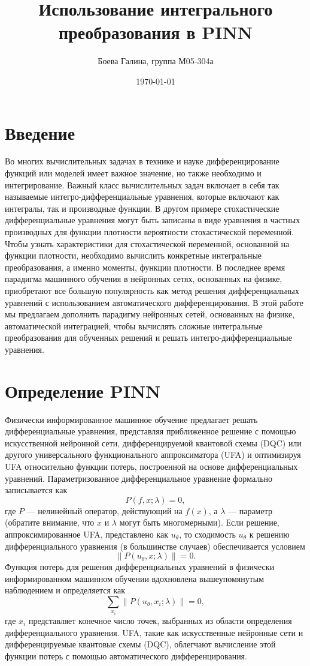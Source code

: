 \documentclass[a4paper,12pt]{article}
\theoremstyle{plain} %
\theoremstyle{definition} %
\theoremstyle{remark} %
\begin{document}
\title{Использование интегрального преобразования в PINN}
\author{Боева Галина, группа М05-304а}
\date{\today}

\maketitle

\section{Введение}

Во многих вычислительных задачах в технике и науке дифференцирование функций или моделей имеет важное значение, но также необходимо и интегрирование. Важный класс вычислительных задач включает в себя так называемые интегро-дифференциальные уравнения, которые включают как интегралы, так и производные функции. В другом примере стохастические дифференциальные уравнения могут быть записаны в виде уравнения в частных производных для функции плотности вероятности стохастической переменной. Чтобы узнать характеристики для стохастической переменной, 
основанной на функции плотности, необходимо вычислить конкретные интегральные преобразования, а именно моменты, функции плотности. 
В последнее время парадигма машинного обучения в нейронных сетях, основанных на физике, приобретают все большую популярность как метод решения дифференциальных уравнений с использованием автоматического дифференцирования. В этой работе мы предлагаем дополнить парадигму нейронных сетей, основанных на физике, автоматической интеграцией, чтобы вычислять сложные интегральные преобразования для обученных решений и решать интегро-дифференциальные уравнения.

\section{Определение PINN}

Физически информированное машинное обучение предлагает решать дифференциальные уравнения, представляя приближенное решение с помощью искусственной нейронной сети, дифференцируемой квантовой схемы (DQC) или другого универсального функционального аппроксиматора (UFA) и оптимизируя UFA относительно функции потерь, построенной на основе дифференциальных уравнений. Параметризованное дифференциальное уравнение формально записывается как
\[
P(f, x; \lambda) = 0,
\]
где \(P\) — нелинейный оператор, действующий на \(f(x)\), а \(\lambda\) — параметр (обратите внимание, что \(x\) и \(\lambda\) могут быть многомерными). Если решение, аппроксимированное UFA, представлено как \(u_\theta\), то сходимость \(u_\theta\) к решению дифференциального уравнения (в большинстве случаев) обеспечивается условием
\[
\|P(u_\theta, x; \lambda)\| = 0.
\]
Функция потерь для решения дифференциальных уравнений в физически информированном машинном обучении вдохновлена вышеупомянутым наблюдением и определяется как
\[
\sum_{x_i} \|P(u_\theta, x_i; \lambda)\| = 0,
\]
где \(x_i\) представляет конечное число точек, выбранных из области определения дифференциального уравнения. UFA, такие как искусственные нейронные сети и дифференцируемые квантовые схемы (DQC), облегчают вычисление этой функции потерь с помощью автоматического дифференцирования.
\end{document}
